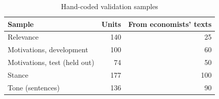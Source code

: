 \begin{table}[htbp]
\centering\small
\caption{Hand-coded validation samples}\label{tab:samples}
\begin{tabular}{@{}lrr@{}}
\toprule
\textbf{Sample} & \textbf{Units} & \textbf{From economists' texts} \\
\midrule
Relevance & 140 & 25 \\
Motivations, development & 100 & 60 \\
Motivations, test (held out) & 74 & 50 \\
Stance & 177 & 100 \\
Tone (sentences) & 136 & 90 \\
\bottomrule
\end{tabular}
\end{table}
